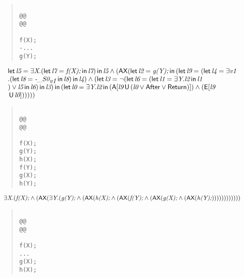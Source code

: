 \documentclass{article}
\newcommand{\U}{\,\mbox{\sf{U}}\,}
\newcommand{\A}{\mbox{\sf{A}}}
\newcommand{\E}{\mbox{\sf{E}}}
\newcommand{\AX}{\mbox{\sf{AX}}}
\newcommand{\mita}[1]{\mbox{\it{{#1}}}}
\newcommand{\msf}[1]{\mbox{\sf{{#1}}}}
\begin{document}
\begin{quote}\begin{verbatim}

@@
@@

f(X);
-...
g(Y);
\end{verbatim}\end{quote}

\[\begin{array}{l}
\mita{\sf{let}} \, \mita{l5} = \exists \mita{X} . (\mita{\sf{let}} \, \mita{l7} = \mita{f(X);} \, \mita{\sf{in}} \, \mita{l7}
) \, \mita{\sf{in}} \, \mita{l5} \wedge (\AX(\mita{\sf{let}} \, \mita{l2} = \mita{g(Y);} \, \mita{\sf{in}} \, (\mita{\sf{let}} \, \mita{l9} = (\mita{\sf{let}} \, \mita{l4} = \exists \mita{v1}\\\mbox{} . (\mita{\sf{let}} \, \mita{l8} = \mita{-\_S0}_{\mita{v1}} \, \mita{\sf{in}} \, \mita{l8}
) \, \mita{\sf{in}} \, \mita{l4}
) \wedge (\mita{\sf{let}} \, \mita{l3} = \neg (\mita{\sf{let}} \, \mita{l6} = (\mita{\sf{let}} \, \mita{l1} = \exists \mita{Y} . \mita{l2} \, \mita{\sf{in}} \, \mita{l1}\\\mbox{}
) \vee \mita{l5} \, \mita{\sf{in}} \, \mita{l6}
) \, \mita{\sf{in}} \, \mita{l3}
) \, \mita{\sf{in}} \, (\mita{\sf{let}} \, \mita{l0} = \exists \mita{Y} . \mita{l2} \, \mita{\sf{in}} \, (\A[\mita{l9} \U (\mita{l0} \vee \msf{After} \vee \msf{Return})]
) \wedge (\E[\mita{l9}\\\mbox{} \U \mita{l0}]
)
)
)
))

\end{array}\]

\begin{quote}\begin{verbatim}

@@
@@

f(X);
g(Y);
h(X);
f(Y);
g(X);
h(Y);
\end{verbatim}\end{quote}

\[\begin{array}{l}
\exists \mita{X} . (\mita{f(X);} \wedge (\AX(\exists \mita{Y} . (\mita{g(Y);} \wedge (\AX(\mita{h(X);} \wedge (\AX(\mita{f(Y);} \wedge (\AX(\mita{g(X);} \wedge (\AX(\mita{h(Y);}))))))))))))
\end{array}\]

\begin{quote}\begin{verbatim}

@@
@@

f(X);
...
g(X);
h(X);
\end{verbatim}\end{quote}
\end{document}
